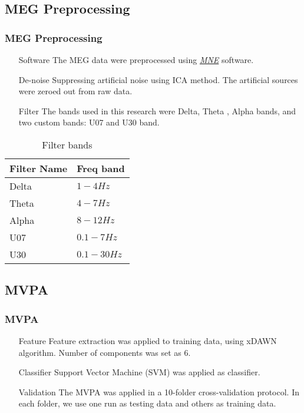 \documentclass{beamer}
\begin{document}
\subsection{MEG Preprocessing}
\begin{frame}
    \frametitle{MEG Preprocessing}

    \begin{itemize}
        \item [Software] The MEG data were preprocessed using \hyperlink{https://mne.tools/stable/index.html}{\emph{MNE}} software.
        \item [De-noise] Suppressing artificial noise using ICA method. The artificial sources were zeroed out from raw data.
        \item [Filter] The bands used in this research were Delta, Theta , Alpha bands, and two custom bands: U07 and U30 band.
    \end{itemize}

    \begin{table}[t]
        \caption{Filter bands}
        \begin{tabular}{|l|l|}
            \hline
            \textbf{Filter Name} & \textbf{Freq band} \\
            \hline
            Delta                & $1 - 4 Hz$         \\
            Theta                & $4 - 7 Hz$         \\
            Alpha                & $8 - 12 Hz$        \\
            \hline
            U07                  & $0.1 - 7 Hz$       \\
            U30                  & $0.1 - 30 Hz$      \\
            \hline
        \end{tabular}
    \end{table}

\end{frame}

\subsection{MVPA}
\begin{frame}
    \frametitle{MVPA}
    \begin{itemize}
        \item [Feature] Feature extraction was applied to training data, using xDAWN algorithm.
              Number of components was set as $6$.
        \item [Classifier] Support Vector Machine (SVM) was applied as classifier.
        \item [Validation] The MVPA was applied in a 10-folder cross-validation protocol.
              In each folder, we use one run as testing data and others as training data.
    \end{itemize}
\end{frame}
\end{document}
